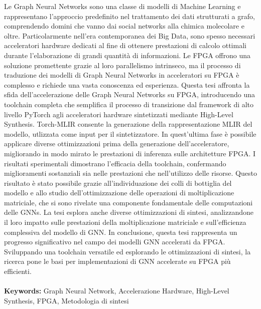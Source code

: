 Le Graph Neural Networks sono una classe di modelli di Machine Learning e rappresentano l'approccio predefinito nel trattamento dei dati strutturati a grafo, comprendendo domini che vanno dai social networks alla chimica molecolare e oltre.
Particolarmente nell'era contemporanea dei Big Data, sono spesso necessari acceleratori hardware dedicati al fine di ottenere prestazioni di calcolo ottimali durante l'elaborazione di grandi quantità di informazioni.
Le FPGA offrono una soluzione promettente grazie al loro parallelismo intrinseco, ma il processo di traduzione dei modelli di Graph Neural Networks in acceleratori su FPGA è complesso e richiede una vasta conoscenza ed esperienza.
Questa tesi affronta la sfida dell'accelerazione delle Graph Neural Networks su FPGA, introducendo una toolchain completa che semplifica il processo di transizione dal framework di alto livello PyTorch agli acceleratori hardware sintetizzati mediante High-Level Synthesis.
Torch-MLIR consente la generazione della rappresentazione MLIR del modello, utlizzata come input per il sintetizzatore.
In quest'ultima fase è possibile applicare diverse ottimizzazioni prima della generazione dell'acceleratore, migliorando in modo mirato le prestazioni di inferenza sulle architetture FPGA\@.
I risultati sperimentali dimostrano l'efficacia della toolchain, confermando miglioramenti sostanziali sia nelle prestazioni che nell'utilizzo delle risorse.
Questo risultato è stato possibile grazie all'individuazione dei colli di bottiglia del modello e allo studio dell'ottimizzazione delle operazioni di moltiplicazione matriciale, che si sono rivelate una componente fondamentale delle computazioni delle GNNs.
La tesi esplora anche diverse ottimizzazioni di sintesi, analizzandone il loro impatto sulle prestazioni della moltiplicazione matriciale e sull'efficienza complessiva del modello di GNN\@.
In conclusione, questa tesi rappresenta un progresso significativo nel campo dei modelli GNN accelerati da FPGA\@.
Sviluppando una toolchain versatile ed esplorando le ottimizzazioni di sintesi, la ricerca pone le basi per implementazioni di GNN accelerate su FPGA più efficienti.
\\
\\
\textbf{Keywords:} Graph Neural Network, Accelerazione Hardware, High-Level Synthesis, FPGA, Metodologia di sintesi %